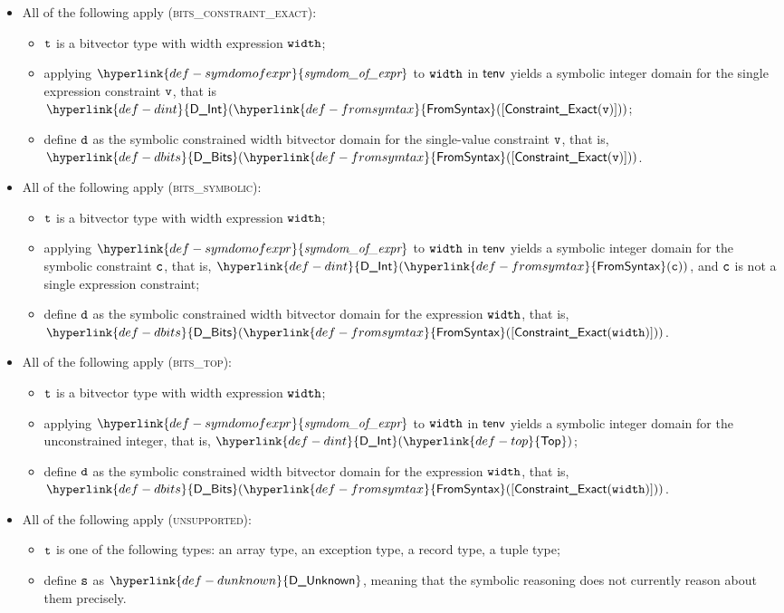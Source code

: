 \documentclass{book}
\newcommand\DInt[0]{\hyperlink{def-dint}{\textsf{D\_Int}}}
\newcommand\DBits[0]{\hyperlink{def-dbits}{\textsf{D\_Bits}}}
\newcommand\DUnknown[0]{\hyperlink{def-dunknown}{\textsf{D\_Unknown}}}
\newcommand\Top[0]{\hyperlink{def-top}{\textsf{Top}}}
\newcommand\FromSyntax[0]{\hyperlink{def-fromsymtax}{\textsf{FromSyntax}}}
\newcommand\symdomofexpr[0]{\hyperlink{def-symdomofexpr}{\textfunc{symdom\_of\_expr}}}
\begin{document}
\begin{itemize}
  \item All of the following apply (\textsc{bits\_constraint\_exact}):
  \begin{itemize}
    \item $\texttt{t}$ is a bitvector type with width expression $\texttt{width}$;
    \item applying $\symdomofexpr$ to $\texttt{width}$ in $\textsf{tenv}$ yields a symbolic integer domain for the single expression constraint $\texttt{v}$,
          that is \\
          $\DInt(\FromSyntax([\ConstraintExact(\vv)]))$;
    \item define $\texttt{d}$ as the symbolic constrained width bitvector domain for the single-value constraint $\texttt{v}$, that is,
          $\DBits(\FromSyntax([\ConstraintExact(\vv)]))$.
  \end{itemize}

  \item All of the following apply (\textsc{bits\_symbolic}):
  \begin{itemize}
    \item $\texttt{t}$ is a bitvector type with width expression $\texttt{width}$;
    \item applying $\symdomofexpr$ to $\texttt{width}$ in $\textsf{tenv}$ yields a symbolic integer domain for the symbolic constraint $\texttt{c}$,
          that is, $\DInt(\FromSyntax(\vc))$, and $\texttt{c}$ is not a single expression constraint;
    \item define $\texttt{d}$ as the symbolic constrained width bitvector domain for the expression $\texttt{width}$, that is,
          $\DBits(\FromSyntax([\ConstraintExact(\width)]))$.
  \end{itemize}

  \item All of the following apply (\textsc{bits\_top}):
  \begin{itemize}
    \item $\texttt{t}$ is a bitvector type with width expression $\texttt{width}$;
    \item applying $\symdomofexpr$ to $\texttt{width}$ in $\textsf{tenv}$ yields a symbolic integer domain for the unconstrained integer,
          that is, $\DInt(\Top)$;
    \item define $\texttt{d}$ as the symbolic constrained width bitvector domain for the expression $\texttt{width}$, that is,
          $\DBits(\FromSyntax([\ConstraintExact(\width)]))$.
  \end{itemize}

  \item All of the following apply (\textsc{unsupported}):
  \begin{itemize}
    \item $\texttt{t}$ is one of the following types: an array type, an exception type, a record type, a tuple type;
    \item define $\texttt{s}$ as $\DUnknown$, meaning that the symbolic reasoning does not currently reason about them precisely.
  \end{itemize}


\end{itemize}
\end{document}
